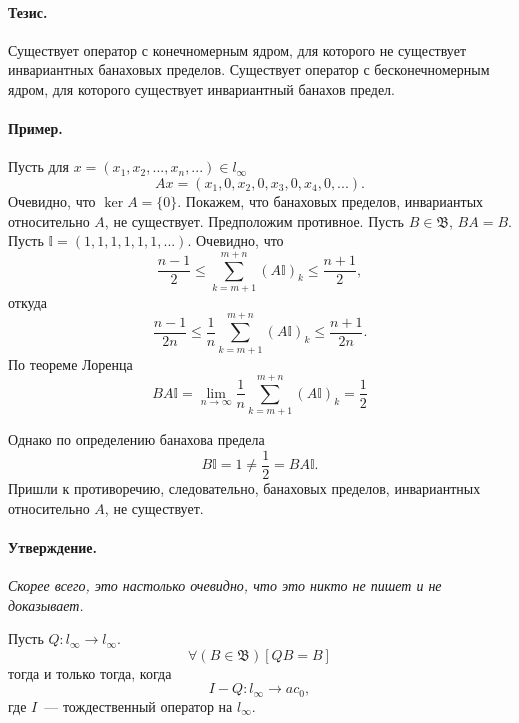 \documentclass[a4paper,14pt]{article} %
\begin{document}

\paragraph{Тезис.}
Существует оператор с конечномерным ядром, для которого не существует инвариантных банаховых пределов.
Существует оператор с бесконечномерным ядром, для которого существует инвариантный банахов предел.

\paragraph{Пример.}

Пусть для $x = (x_1, x_2, ..., x_n, ...)\in l_\infty$
\begin{equation}
	Ax = (x_1, 0, x_2, 0, x_3, 0, x_4, 0, ...).
\end{equation}
Очевидно, что $\ker A = \{0\}$.
Покажем, что банаховых пределов, инвариантых относительно $A$, не существует.
Предположим противное.
Пусть $B\in\mathfrak{B}$, $BA = B$.
Пусть $\mathbb{I} = (1, 1, 1, 1, 1, 1, ...)$.
Очевидно, что
%
\begin{equation}
	\frac{n-1}{2}\leqslant \sum_{k=m+1}^{m+n} (A\mathbb{I})_k \leqslant \frac{n+1}{2},
\end{equation}
откуда
\begin{equation}
	\frac{n-1}{2n}\leqslant \frac{1}{n}\sum_{k=m+1}^{m+n} (A\mathbb{I})_k \leqslant \frac{n+1}{2n}.
\end{equation}
По теореме Лоренца
\begin{equation}
	BA\mathbb{I} = 
	\lim_{n\to\infty} \frac{1}{n}\sum_{k=m+1}^{m+n} (A\mathbb{I})_k = \frac{1}{2}
\end{equation}

Однако по определению банахова предела
\begin{equation}
	B\mathbb{I} = 1 \neq \frac{1}{2} = BA\mathbb{I}.
\end{equation}
Пришли к противоречию, следовательно, банаховых пределов, инвариантных относительно $A$, не существует.


\paragraph{Утверждение.}

\textit{Скорее всего, это настолько очевидно, что это никто не пишет и не доказывает.}

Пусть $Q:l_\infty \to l_\infty$.
\begin{equation}
	\forall(B\in\mathfrak{B})[QB = B]
\end{equation}
тогда и только тогда, когда
\begin{equation}\label{I-Q_to_ac_0}
	I-Q : l_\infty \to ac_0,
\end{equation}
где $I$~--- тождественный оператор на $l_\infty$.
\end{document}
